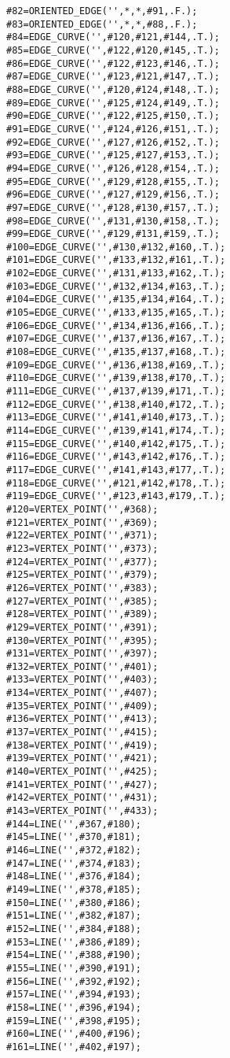 \documentclass[a4paper,12pt]{article}
\begin{document}
\begin{lstlising}[language=C++]
\begin{lstlisting}[language=STEP]
#82=ORIENTED_EDGE('',*,*,#91,.F.);
#83=ORIENTED_EDGE('',*,*,#88,.F.);
#84=EDGE_CURVE('',#120,#121,#144,.T.);
#85=EDGE_CURVE('',#122,#120,#145,.T.);
#86=EDGE_CURVE('',#122,#123,#146,.T.);
#87=EDGE_CURVE('',#123,#121,#147,.T.);
#88=EDGE_CURVE('',#120,#124,#148,.T.);
#89=EDGE_CURVE('',#125,#124,#149,.T.);
#90=EDGE_CURVE('',#122,#125,#150,.T.);
#91=EDGE_CURVE('',#124,#126,#151,.T.);
#92=EDGE_CURVE('',#127,#126,#152,.T.);
#93=EDGE_CURVE('',#125,#127,#153,.T.);
#94=EDGE_CURVE('',#126,#128,#154,.T.);
#95=EDGE_CURVE('',#129,#128,#155,.T.);
#96=EDGE_CURVE('',#127,#129,#156,.T.);
#97=EDGE_CURVE('',#128,#130,#157,.T.);
#98=EDGE_CURVE('',#131,#130,#158,.T.);
#99=EDGE_CURVE('',#129,#131,#159,.T.);
#100=EDGE_CURVE('',#130,#132,#160,.T.);
#101=EDGE_CURVE('',#133,#132,#161,.T.);
#102=EDGE_CURVE('',#131,#133,#162,.T.);
#103=EDGE_CURVE('',#132,#134,#163,.T.);
#104=EDGE_CURVE('',#135,#134,#164,.T.);
#105=EDGE_CURVE('',#133,#135,#165,.T.);
#106=EDGE_CURVE('',#134,#136,#166,.T.);
#107=EDGE_CURVE('',#137,#136,#167,.T.);
#108=EDGE_CURVE('',#135,#137,#168,.T.);
#109=EDGE_CURVE('',#136,#138,#169,.T.);
#110=EDGE_CURVE('',#139,#138,#170,.T.);
#111=EDGE_CURVE('',#137,#139,#171,.T.);
#112=EDGE_CURVE('',#138,#140,#172,.T.);
#113=EDGE_CURVE('',#141,#140,#173,.T.);
#114=EDGE_CURVE('',#139,#141,#174,.T.);
#115=EDGE_CURVE('',#140,#142,#175,.T.);
#116=EDGE_CURVE('',#143,#142,#176,.T.);
#117=EDGE_CURVE('',#141,#143,#177,.T.);
#118=EDGE_CURVE('',#121,#142,#178,.T.);
#119=EDGE_CURVE('',#123,#143,#179,.T.);
#120=VERTEX_POINT('',#368);
#121=VERTEX_POINT('',#369);
#122=VERTEX_POINT('',#371);
#123=VERTEX_POINT('',#373);
#124=VERTEX_POINT('',#377);
#125=VERTEX_POINT('',#379);
#126=VERTEX_POINT('',#383);
#127=VERTEX_POINT('',#385);
#128=VERTEX_POINT('',#389);
#129=VERTEX_POINT('',#391);
#130=VERTEX_POINT('',#395);
#131=VERTEX_POINT('',#397);
#132=VERTEX_POINT('',#401);
#133=VERTEX_POINT('',#403);
#134=VERTEX_POINT('',#407);
#135=VERTEX_POINT('',#409);
#136=VERTEX_POINT('',#413);
#137=VERTEX_POINT('',#415);
#138=VERTEX_POINT('',#419);
#139=VERTEX_POINT('',#421);
#140=VERTEX_POINT('',#425);
#141=VERTEX_POINT('',#427);
#142=VERTEX_POINT('',#431);
#143=VERTEX_POINT('',#433);
#144=LINE('',#367,#180);
#145=LINE('',#370,#181);
#146=LINE('',#372,#182);
#147=LINE('',#374,#183);
#148=LINE('',#376,#184);
#149=LINE('',#378,#185);
#150=LINE('',#380,#186);
#151=LINE('',#382,#187);
#152=LINE('',#384,#188);
#153=LINE('',#386,#189);
#154=LINE('',#388,#190);
#155=LINE('',#390,#191);
#156=LINE('',#392,#192);
#157=LINE('',#394,#193);
#158=LINE('',#396,#194);
#159=LINE('',#398,#195);
#160=LINE('',#400,#196);
#161=LINE('',#402,#197);

\end{lstlisting}
\end{lstlising}
\end{document}
